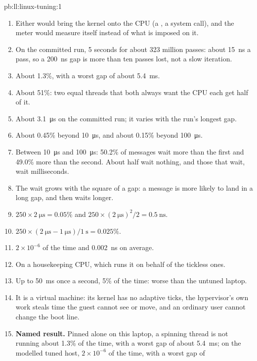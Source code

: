 \begin{solution}{pb:ll:linux-tuning:1}
\begin{enumerate}
\item Either would bring the kernel onto the CPU (a , a system call), and the meter would measure itself instead of
what is imposed on it.
\item On the committed run, 5 seconds for about 323 million passes: about \qty{15}{\nano\second} a pass, so a
\qty{200}{\nano\second} gap is more than ten passes lost, not a slow iteration.
\item About 1.3\%, with a worst gap of about \qty{5.4}{\milli\second}.
\item About 51\%: two equal threads that both always want the CPU each get half of it.
\item About \qty{3.1}{\micro\second} on the committed run; it varies with the run's longest gap.
\item About 0.45\% beyond \qty{10}{\micro\second}, and about 0.15\% beyond \qty{100}{\micro\second}.
\item Between \qty{10}{\micro\second} and \qty{100}{\micro\second}: 50.2\% of messages wait more than the first and 49.0\% more
than the second. About half wait nothing, and those that wait, wait milliseconds.
\item The wait grows with the square of a gap: a message is more likely to land in a long gap, and then waits longer.
\item $250 \times \qty{2}{\micro\second} = 0.05\%$ and $250 \times (\qty{2}{\micro\second})^2 / 2 = \qty{0.5}{\nano\second}$.
\item $250 \times (\qty{2}{\micro\second} - \qty{1}{\micro\second}) / \qty{1}{\second} = 0.025\%$.
\item $2 \times 10^{-6}$ of the time and \qty{0.002}{\nano\second} on average.
\item On a housekeeping CPU, which runs it on behalf of the tickless ones.
\item Up to \qty{50}{\milli\second} once a second, 5\% of the time: worse than the untuned laptop.
\item It is a virtual machine: its kernel has no adaptive ticks, the hypervisor's own work steals time the guest cannot see
or move, and an ordinary user cannot change the boot line.
\item \textbf{Named result.} Pinned alone on this laptop, a spinning thread is not running about 1.3\% of the time, with a worst
gap of about \qty{5.4}{\milli\second}; on the modelled tuned host, $2 \times 10^{-6}$ of the time, with a worst gap of

\end{enumerate}
\end{solution}
